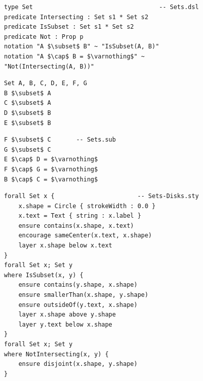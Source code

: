 \begin{figure}[ph]
\begin{minipage}[t]{\columnwidth}
\begin{mdframed}[style=DSLCode]
\begin{lstlisting}[language=Elem,escapechar=@,numbers=none]
type Set                                   -- Sets.dsl
predicate Intersecting : Set s1 * Set s2
predicate IsSubset : Set s1 * Set s2
predicate Not : Prop p
notation "A $\subset$ B" ~ "IsSubset(A, B)"
notation "A $\cap$ B = $\varnothing$" ~ "Not(Intersecting(A, B))"
\end{lstlisting}
\end{mdframed}
\end{minipage}
\begin{mdframed}[style=SUBCode]
\begin{minipage}[t]{0.5\columnwidth}
\begin{lstlisting}[language=Sub-SET,escapechar=@,numbers=none]
Set A, B, C, D, E, F, G
B $\subset$ A
C $\subset$ A
D $\subset$ B
E $\subset$ B
\end{lstlisting}
\end{minipage}
\ContinueLineNumber
\begin{minipage}[t]{.45\columnwidth}
\begin{lstlisting}[language=Sub-mesh,escapechar=@,numbers=none]
F $\subset$ C       -- Sets.sub
G $\subset$ C
E $\cap$ D = $\varnothing$
F $\cap$ G = $\varnothing$
B $\cap$ C = $\varnothing$
\end{lstlisting}\end{minipage}\end{mdframed}
\vspace{-.9\baselineskip}
\begin{minipage}[t]{\columnwidth}
\begin{mdframed}[style=STYCode]
\begin{lstlisting}[language=Sty-ST,escapechar=@,numbers=none]
forall Set x {                       -- Sets-Disks.sty
    x.shape = Circle { strokeWidth : 0.0 }
    x.text = Text { string : x.label }
    ensure contains(x.shape, x.text)
    encourage sameCenter(x.text, x.shape)
    layer x.shape below x.text
}
forall Set x; Set y
where IsSubset(x, y) {
    ensure contains(y.shape, x.shape)
    ensure smallerThan(x.shape, y.shape)
    ensure outsideOf(y.text, x.shape)
    layer x.shape above y.shape
    layer y.text below x.shape
}
forall Set x; Set y
where NotIntersecting(x, y) {
    ensure disjoint(x.shape, y.shape)
}\end{lstlisting}\end{mdframed}\end{minipage}

\end{figure}
